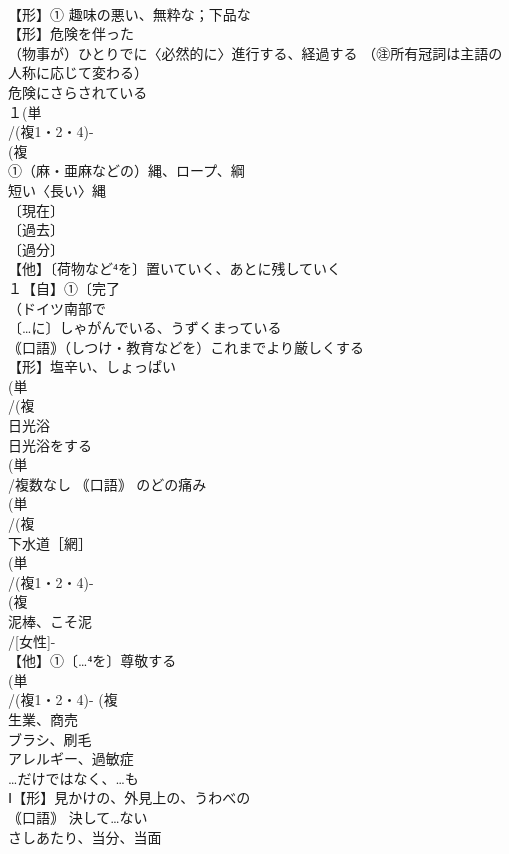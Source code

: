 \documentclass[8pt]{extreport}
\begin{document}
\begin{CJK}{UTF8}{min}
\\	【形】① 趣味の悪い、無粋な；下品な 
\\	【形】危険を伴った 
\\	（物事が）ひとりでに〈必然的に〉進行する、経過する （㊟所有冠詞は主語の人称に応じて変わる）
\\	危険にさらされている
\\	１(単
\\	/(複1・2・4)-
\\	(複
\\	①（麻・亜麻などの）縄、ロープ、綱 
\\	短い〈長い〉縄 
\\	〔現在〕
\\	〔過去〕
\\	〔過分〕
\\	【他】〔荷物など⁴を〕置いていく、あとに残していく 
\\	１【自】①〔完了
\\	（ドイツ南部で
\\	〔…に〕しゃがんでいる、うずくまっている
\\	｟口語｠（しつけ・教育などを）これまでより厳しくする
\\	【形】塩辛い、しょっぱい 
\\	(単
\\	/(複
\\	日光浴 
\\	日光浴をする
\\	(単
\\	/複数なし ｟口語｠ のどの痛み 
\\	(単
\\	/(複
\\	下水道［網］
\\	(単
\\	/(複1・2・4)-
\\	(複
\\	泥棒、こそ泥 
\\	/[女性]-
\\	【他】①〔…⁴を〕尊敬する 
\\	(単
\\	/(複1・2・4)- (複
\\	生業、商売 
\\	ブラシ、刷毛 
\\	アレルギー、過敏症
\\	…だけではなく、…も
\\	Ⅰ【形】見かけの、外見上の、うわべの
\\	｟口語｠ 決して…ない
\\	さしあたり、当分、当面

\end{CJK}
\end{document}
